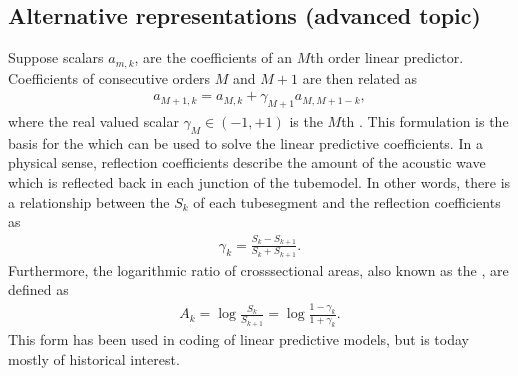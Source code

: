 \documentclass[letterpaper,10pt,english]{jupyterBook}
\begin{document}
\subsection{Alternative representations (advanced topic)}
\label{\detokenize{Representations/Linear_prediction:alternative-representations-advanced-topic}}
\sphinxAtStartPar
Suppose scalars \(a_{m,k}\), are the coefficients of an \(M\)th
order linear predictor. Coefficients of consecutive orders \(M\) and \(M+1\)
are then related as
\begin{equation*}
\begin{split} a_{M+1,k} = a_{M,k} + \gamma_{M+1} a_{M,M+1-k}, \end{split}
\end{equation*}
\sphinxAtStartPar
where the real valued scalar \( \gamma_{M}\in(-1,+1) \) is the
\(M\)th . This
formulation is the basis for the  which can
be used to solve the linear predictive coefficients. In a physical
sense, reflection coefficients describe the amount of the acoustic wave
which is reflected back in each junction of the tube\sphinxhyphen{}model. In other
words, there is a relationship between the 
\(S_{k}\) of each tube\sphinxhyphen{}segment and the reflection coefficients as
\begin{equation*}
\begin{split} \gamma_k = \frac{S_k - S_{k+1}}{S_k + S_{k+1}}. \end{split}
\end{equation*}
\sphinxAtStartPar
Furthermore, the logarithmic ratio of cross\sphinxhyphen{}sectional areas, also known
as the , are defined as
\begin{equation*}
\begin{split} A_k = \log\frac{S_k}{S_{k+1}} =
\log\frac{1-\gamma_k}{1+\gamma_k}. \end{split}
\end{equation*}
\sphinxAtStartPar
This form has been used in coding of linear predictive models, but is
today mostly of historical interest.

\sphinxstepscope
\end{document}
